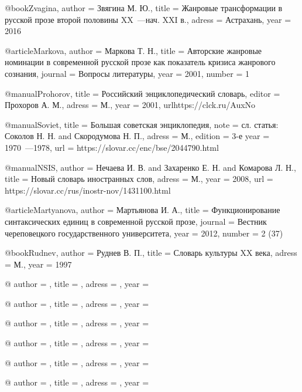 \documentclass{kursa4}
\begin{document}
@book{Zvagina,
author = {Звягина М. Ю.},
title = {Жанровые трансформации в русской прозе второй половины XX~---нач. XXI в.},
adress = {Астрахань},
year = {2016}  
}

@article{Markova,
author = {Маркова Т. Н.},
title = {Авторские жанровые номинации в современной русской прозе как показатель кризиса жанрового сознания},
journal = {Вопросы литературы},
year = {2001},
number = {1}
}

@manual{Prohorov,
title = {Российский энциклопедический словарь},
editor = {Прохоров А. М.},
adress = {М.},
year = {2001},
url{https://clck.ru/AuxNo}
}

@manual{Soviet,
title = {Большая советская энциклопедия},
note = {сл. статья: Соколов Н. Н. and Скородумова Н. П.},
adress = {М.},
edition = {3-е}
year = {1970~---1978},
url = {https://slovar.cc/enc/bse/2044790.html}
}

@manual{NSIS,
author = {Нечаева И. В. and Захаренко Е. Н. and Комарова Л. Н.},
title = {Новый словарь иностранных слов},
adress = {М.},
year = {2008},
url = {https://slovar.cc/rus/inostr-nov/1431100.html}
}

@article{Martyanova,
author = {Мартьянова И. А.},
title = {Функционирование синтаксических единиц в современной русской прозе},
journal = {Вестник череповецкого государственного университета},
year = {2012},
number = {2 (37)}
}

@book{Rudnev,
author = {Руднев В. П.},
title = {Словарь культуры XX века},
adress = {М.},
year = {1997}
}

@{
author = {},
title = {},
adress = {},
year = {}
}

@{
author = {},
title = {},
adress = {},
year = {}
}


@{
author = {},
title = {},
adress = {},
year = {}
}


@{
author = {},
title = {},
adress = {},
year = {}
}


@{
author = {},
title = {},
adress = {},
year = {}
}


@{
author = {},
title = {},
adress = {},
year = {}
}
\end{document}
